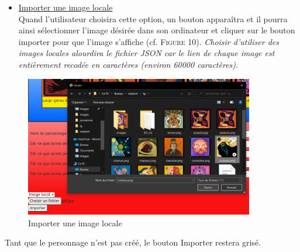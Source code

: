 \documentclass{article}
\begin{document}
                \begin{itemize}
                \item \underline{\textsf{Importer une image locale}}\\
                    Quand l'utilisateur choisira cette option, un bouton apparaîtra et il pourra ainsi sélectionner l'image désirée dans son ordinateur et cliquer sur le bouton importer pour que l'image s'affiche (cf. \textsc{Figure 10}).
                    \textit{Choisir d'utiliser des images locales alourdira le fichier JSON car le lien de chaque image est entièrement recodée en caractères (environ 60000 caractères).}
                \end{itemize}
                \begin{figure}[h]
                    \centering \includegraphics[width=10cm]{images/importLocal.png}
                    \caption{Importer une image locale}
                \end{figure}
                \begin{center}
                    Tant que le personnage n'est pas créé, le bouton Importer restera grisé.
                \end{center}
            \pagebreak
            
\end{document}
